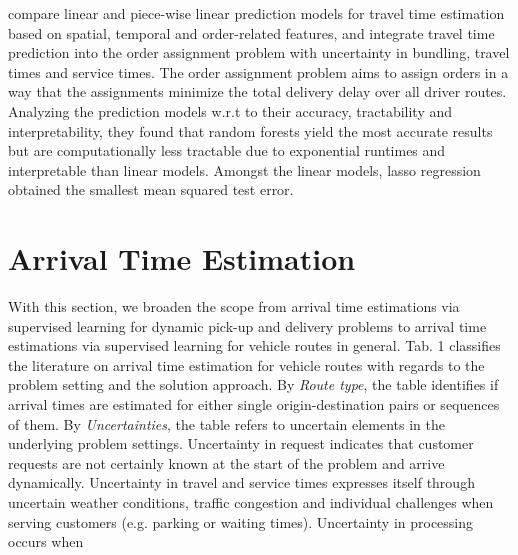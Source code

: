\cite{Liu2018_LM_PLM} compare linear and piece-wise linear prediction models for travel time estimation based on spatial, temporal and order-related features, and integrate travel time prediction into the order assignment problem with uncertainty in bundling, travel times and service times. The order assignment problem aims to assign orders in a way that the assignments minimize the total delivery delay over all driver routes. Analyzing the prediction models w.r.t to their accuracy, tractability and interpretability, they found that random forests yield the most accurate results but are computationally less tractable due to exponential runtimes and interpretable than linear models. Amongst the linear models, lasso regression obtained the smallest mean squared test error.


\section{Arrival Time Estimation}




With this section, we broaden the scope from arrival time estimations via supervised learning for dynamic pick-up and delivery problems to arrival time estimations via supervised learning for vehicle routes in general.
Tab. 1 classifies the literature on arrival time estimation for vehicle routes with regards to the problem setting and the solution approach. 
By \textit{Route type}, the table identifies if arrival times are estimated for either single origin-destination pairs or sequences of them. 
By \textit{Uncertainties}, the table refers to uncertain elements in the underlying problem settings. Uncertainty in request indicates that customer requests are not certainly known at the start of the problem and arrive dynamically. Uncertainty in travel and service times expresses itself through uncertain weather conditions, traffic congestion and individual challenges when serving customers (e.g. parking or waiting times). Uncertainty in processing occurs when  

